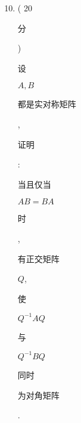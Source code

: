 \documentclass[10pt]{article}
\begin{document}
\begin{enumerate}
  \setcounter{enumi}{9}
  \item ( 20 \begin{CJK}{UTF8}{mj}分\end{CJK}) \begin{CJK}{UTF8}{mj}设\end{CJK} $A, B$ \begin{CJK}{UTF8}{mj}都是实对称矩阵\end{CJK}, \begin{CJK}{UTF8}{mj}证明\end{CJK}: \begin{CJK}{UTF8}{mj}当且仅当\end{CJK} $A B=B A$ \begin{CJK}{UTF8}{mj}时\end{CJK}, \begin{CJK}{UTF8}{mj}有正交矩阵\end{CJK} $Q$, \begin{CJK}{UTF8}{mj}使\end{CJK} $Q^{-1} A Q$ \begin{CJK}{UTF8}{mj}与\end{CJK} $Q^{-1} B Q$ \begin{CJK}{UTF8}{mj}同时\end{CJK} \begin{CJK}{UTF8}{mj}为对角矩阵\end{CJK}.
\end{enumerate}
\end{document}
